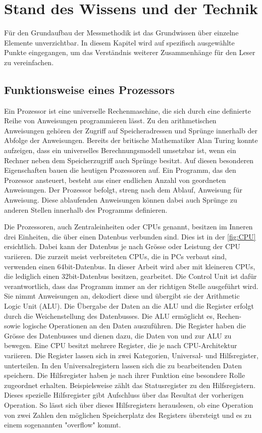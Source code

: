 \chapter{Stand des Wissens und der Technik}
Für den Grundaufbau der Messmethodik ist das Grundwissen über einzelne Elemente unverzichtbar. In diesem Kapitel wird auf spezifisch ausgewählte Punkte eingegangen, um das Verständnis weiterer Zusammenhänge für den Leser zu vereinfachen.


\section{Funktionsweise eines Prozessors}

Ein Prozessor ist eine universelle Rechenmaschine, die sich durch eine definierte Reihe von Anweisungen programmieren lässt. Zu den arithmetischen Anweisungen gehören der Zugriff auf Speicheradressen und Sprünge innerhalb der Abfolge der Anweisungen.
Bereits der britische Mathematiker Alan Turing konnte aufzeigen, dass ein universelles Berechnungsmodell umsetzbar ist, wenn ein Rechner neben dem Speicherzugriff auch Sprünge besitzt\cite{Hoffmann2014l}. Auf diesen besonderen Eigenschaften bauen die heutigen Prozessoren auf. Ein Programm, das den Prozessor ansteuert, besteht aus einer endlichen Anzahl von geordneten Anweisungen. Der Prozessor befolgt, streng nach dem Ablauf, Anweisung für Anweisung. Diese ablaufenden Anweisungen können dabei auch Sprünge zu anderen Stellen innerhalb des Programms definieren.
\par
Die Prozessoren, auch Zentraleinheiten oder CPUs genannt, besitzen im Inneren drei Einheiten, die über einen Datenbus verbunden sind. Dies ist in der \autoref{fig:CPU} ersichtlich. Dabei kann der Datenbus je nach Grösse oder Leistung der CPU variieren. Die zurzeit meist verbreiteten CPUs, die in PCs verbaut sind, verwenden einen 64bit-Datenbus. In dieser Arbeit wird aber mit kleineren CPUs, die lediglich einen 32bit-Datenbus besitzen, gearbeitet. Die Control Unit\cite{patterson2013computer} ist dafür verantwortlich, dass das Programm immer an der richtigen Stelle ausgeführt wird. Sie nimmt Anweisungen an, dekodiert diese und übergibt sie der Arithmetic Logic Unit (ALU). Die Übergabe der Daten an die ALU und die Register erfolgt durch die Weichenstellung des Datenbusses. Die ALU ermöglicht es, Rechen- sowie logische Operationen an den Daten auszuführen. Die Register haben die Grösse des Datenbusses und dienen dazu, die Daten von und zur ALU zu bewegen. Eine CPU besitzt mehrere Register, die je nach CPU-Architektur variieren. Die Register lassen sich in zwei Kategorien, Universal- und Hilfsregister, unterteilen. In den Universalregistern lassen sich die zu bearbeitenden Daten speichern. Die Hilfsregister haben je nach ihrer Funktion eine besondere Rolle zugeordnet erhalten. Beispielsweise zählt das Statusregister zu den Hilfsregistern. Dieses spezielle Hilfsregister gibt Aufschluss über das Resultat der vorherigen Operation. So lässt sich über dieses Hilfsregisters herauslesen, ob eine Operation von zwei Zahlen den möglichen Speicherplatz des Registers übersteigt und es zu einem sogenannten "overflow" kommt.
